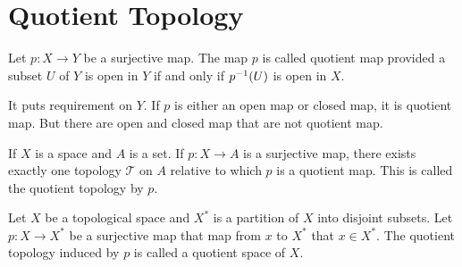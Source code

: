 \section{Quotient Topology}

\begin{definition}
    Let $p: X \rightarrow Y$ be a surjective map. The map $p$ is called quotient map provided a subset $U$ of $Y$ is open in $Y$ if and only if ${p}^{-1}(U)$ is open in $X$.
    
    It puts requirement on $Y$. If $p$ is either an open map or closed map, it is quotient map. But there are open and closed map that are not quotient map.
\end{definition}

\begin{definition}
    If $X$ is a space and $A$ is a set. If $p: X \rightarrow A$ is a surjective map, there exists exactly one topology $\mathcal{T}$ on $A$ relative to which $p$ is a quotient map. This is called the quotient topology by $p$.
\end{definition}

\begin{definition}
    Let $X$ be a topological space and $X^*$ is a partition of $X$ into disjoint subsets. Let $p:X \rightarrow X^*$ be a surjective map that map from $x$ to $X^*$ that $x \in X^*$. The quotient topology induced by $p$ is called a quotient space of $X$.
\end{definition}







